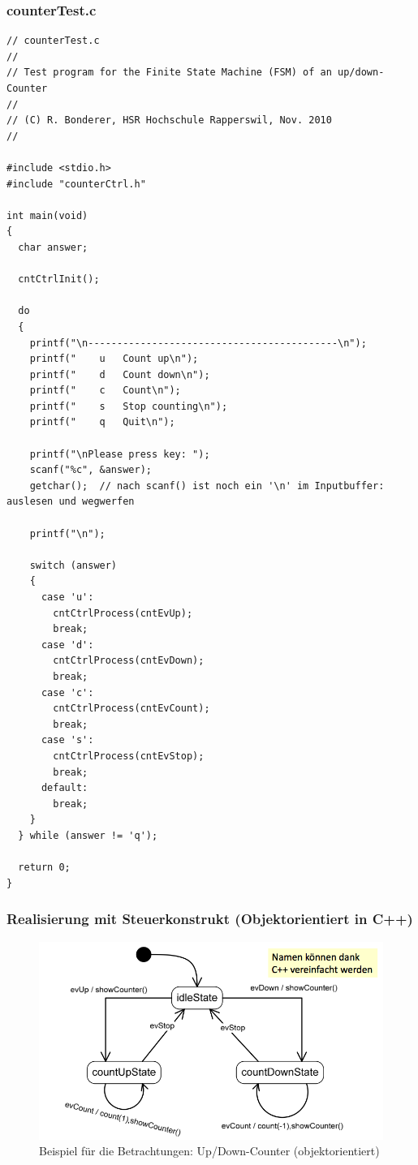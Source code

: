 \subsubsection{counterTest.c}
\label{subsec:counterTest}
\begin{lstlisting}[style=C]
// counterTest.c
//
// Test program for the Finite State Machine (FSM) of an up/down-Counter
//
// (C) R. Bonderer, HSR Hochschule Rapperswil, Nov. 2010
//

#include <stdio.h>
#include "counterCtrl.h"

int main(void)
{
  char answer;
  
  cntCtrlInit();
  
  do
  {
    printf("\n-------------------------------------------\n");
    printf("    u   Count up\n");
    printf("    d   Count down\n");
    printf("    c   Count\n");
    printf("    s   Stop counting\n");
    printf("    q   Quit\n");

    printf("\nPlease press key: ");
    scanf("%c", &answer);
    getchar();  // nach scanf() ist noch ein '\n' im Inputbuffer: auslesen und wegwerfen

    printf("\n");
    
    switch (answer)
    {
      case 'u':
        cntCtrlProcess(cntEvUp);
        break;
      case 'd':
        cntCtrlProcess(cntEvDown);
        break;
      case 'c':
        cntCtrlProcess(cntEvCount);
        break;
      case 's':
        cntCtrlProcess(cntEvStop);
        break;
      default:
        break;
    }
  } while (answer != 'q');
  
  return 0;
}
\end{lstlisting}

\subsubsection{Realisierung mit Steuerkonstrukt (Objektorientiert in
C++)}

\begin{figure}[h]
  \centering
  {\includegraphics[scale = 0.4]{images/FSM/Up_down_counter_obj}  
  \caption{Beispiel für die Betrachtungen: Up/Down-Counter (objektorientiert)}
  \label{fig:up_down_counter_obj}}
\end{figure}

